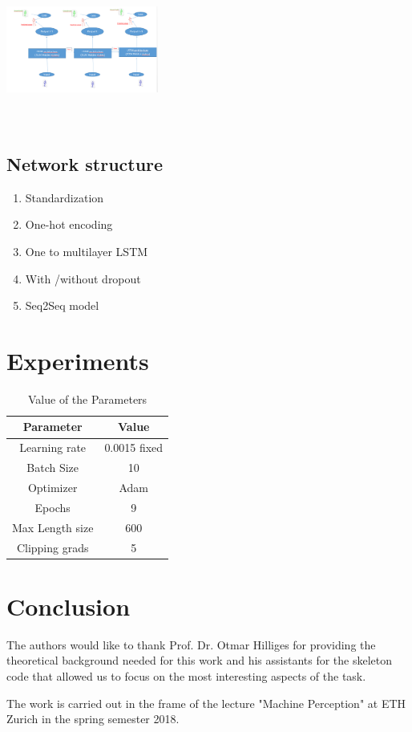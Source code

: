 \includegraphics[width=5cm,height=5cm]{Training_architecture.PNG}
\subsection{Network structure}
 
 \begin{enumerate}
 	\item Standardization
 	\item One-hot encoding
 	\item One to multilayer LSTM
 	\item With /without dropout
 	\item Seq2Seq model
 \end{enumerate}

\section{Experiments}

\begin{table}[]
	\centering
	\caption{Value of the Parameters }
	\label{my-label}
	\begin{tabular}{cc}
			Parameter& Value \\
		\hline
     	\hline
		Learning rate  &  0.0015 fixed    \\
		Batch Size  & 10 \\
		Optimizer  & Adam  \\
		Epochs  & 9 \\
		Max Length size  &  600 \\
		Clipping grads &  5\\
		\hline
	\end{tabular}
\end{table}

\section{Conclusion}


\begin{acks}
	The authors would like to thank Prof. Dr. Otmar Hilliges for providing the theoretical background needed for this work and his assistants for the skeleton code that allowed us to focus on the most interesting aspects of the task.
	
	The work is carried out in the frame of the lecture "Machine Perception" at ETH Zurich in the spring semester 2018.
	
\end{acks}


